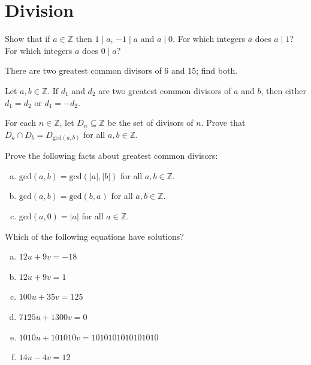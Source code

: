 \section{Division}


\begin{exercise}
\label{exOneDivDivZero}
Show that if $a \in \mathbb{Z}$ then $1 \mid a$, $-1 \mid a$ and $a \mid 0$. For which integers $a$ does $a \mid 1$? For which integers $a$ does $0 \mid a$?
\end{exercise}


\begin{exercise}
\label{exGCDofSixAndFifteen}
There are two greatest common divisors of $6$ and $15$; find both.
\end{exercise}


\begin{exercise}
\label{exGCDUnique}
Let $a,b \in \mathbb{Z}$. If $d_1$ and $d_2$ are two greatest common divisors of $a$ and $b$, then either $d_1=d_2$ or $d_1=-d_2$.
\end{exercise}


\begin{exercise}
For each $n \in \mathbb{Z}$, let $D_n \subseteq \mathbb{Z}$ be the set of divisors of $n$. Prove that $D_a \cap D_b = D_{\mathrm{gcd}(a,b)}$ for all $a,b \in \mathbb{Z}$.
\end{exercise}

\begin{exercise}
\label{exFactsAboutGCDs}
Prove the following facts about greatest common divisors:
\begin{enumerate}[(a)]
\item\label{itmFactsAboutGCDsAbsoluteValue} $\mathrm{gcd}(a,b) = \mathrm{gcd}(|a|,|b|)$ for all $a,b \in \mathbb{Z}$.
\item\label{itmFactsAboutGCDsSwapOrder} $\mathrm{gcd}(a,b) = \mathrm{gcd}(b,a)$ for all $a,b \in \mathbb{Z}$.
\item\label{itmFactsAboutGCDsZero} $\mathrm{gcd}(a,0) = |a|$ for all $a \in \mathbb{Z}$.
\end{enumerate}
\vspace{-20pt}
\end{exercise}


\begin{exercise}
\label{exSolutionsToLDEs}
Which of the following equations have solutions?
\begin{enumerate}[(a)]
\item $12u + 9v = -18$
\item $12u + 9v = 1$
\item $100u + 35v = 125$
\item $7125u + 1300v = 0$
\item $1010u + 101010v = 1010101010101010$
\item $14u - 4v = 12$
\end{enumerate}
\end{exercise}


